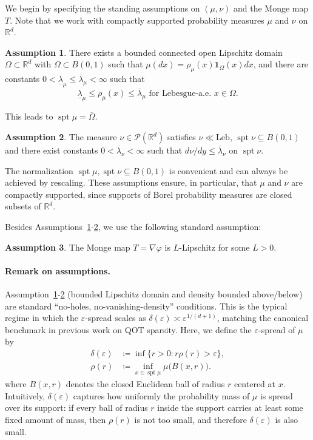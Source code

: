\documentclass{article}
\theoremstyle{plain}
\theoremstyle{definition}
\newtheorem{assumption}{Assumption}
\theoremstyle{remark}
\numberwithin{equation}{section}
\DeclareMathOperator{\spt}{spt}
\newcommand{\R}{\mathbb{R}}
\newcommand{\Leb}{\mathrm{Leb}}
\begin{document}
We begin by specifying the standing assumptions on $(\mu,\nu)$ and the Monge map $T$. 
Note that we work with compactly supported probability measures $\mu$ and $\nu$ on $\R^d$.
\begin{assumption}\label{assu:mu}
There exists a bounded connected open Lipschitz domain $\Omega\subset\R^d$ with $\Omega\subset B(0,1)$ such that $\mu(dx)=\rho_\mu(x)\mathbf 1_{\Omega}(x)dx$, and there are constants $0<\underline\lambda_\mu\le\overline\lambda_\mu<\infty$ such that
$$
\underline\lambda_\mu\le\rho_\mu(x)\le\overline\lambda_\mu\text{ for Lebesgue-a.e. }x\in\Omega.
$$
\end{assumption}
This leads to $\spt\mu=\overline{\Omega}$.
\begin{assumption}\label{assu:nu}
The measure $\nu\in\mathcal{P}(\R^d)$ satisfies $\nu\ll\Leb$, $\spt\nu\subseteq B(0,1)$ and there exist constants $0<\overline\lambda_\nu<\infty$ such that $d\nu/dy\le\overline\lambda_\nu$ on $\spt\nu$.
\end{assumption}

The normalization $\spt\mu,\spt\nu\subseteq B(0,1)$ is convenient and can always be achieved by rescaling. 
These assumptions ensure, in particular, that $\mu$ and $\nu$ are compactly supported, since supports of Borel probability measures are closed subsets of $\R^d$.

Besides Assumptions~\ref{assu:mu}-\ref{assu:nu}, we use the following standard assumption:
\begin{assumption}\label{assu:lipschitz}
The Monge map $T=\nabla\varphi$ is $L$-Lipschitz for some $L>0$.
\end{assumption}
\paragraph{Remark on assumptions.}
Assumption~\ref{assu:mu}-\ref{assu:nu} (bounded Lipschitz domain and density bounded above/below) are standard ``no-holes, no-vanishing-density'' conditions.
This is the typical regime in which the $\varepsilon$-spread scales as $\delta(\varepsilon)\asymp\varepsilon^{1/(d+1)}$, matching the canonical benchmark in previous work on QOT sparsity.
Here, we define the $\varepsilon$-spread of $\mu$ by
$$
\begin{aligned}
\delta(\varepsilon)&\coloneqq\inf\bigl\{r>0: r\rho(r)>\varepsilon\bigr\},\\
\rho(r)&\coloneqq\inf_{x\in\spt\mu}\mu\bigl(B(x,r)\bigr).
\end{aligned}
$$
where $B(x,r)$ denotes the closed Euclidean ball of radius $r$ centered at $x$.
Intuitively, $\delta(\varepsilon)$ captures how uniformly the probability mass of $\mu$ is spread over its support: if every ball of radius $r$ inside the support carries at least some fixed amount of mass, then $\rho(r)$ is not too small, and therefore $\delta(\varepsilon)$ is also small.
\end{document}
